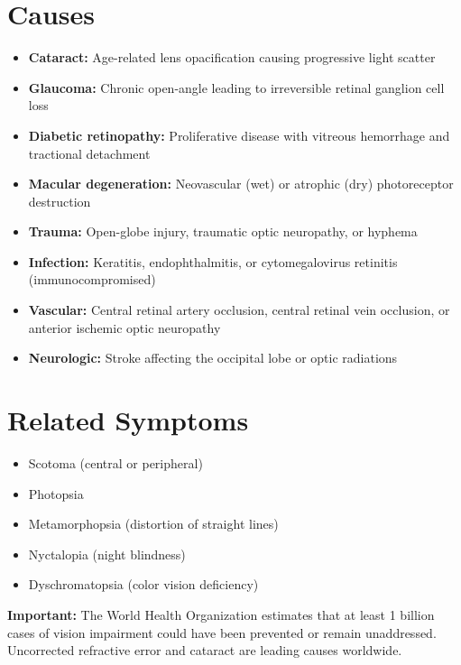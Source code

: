 \section*{Causes}
\begin{itemize}
 \item \textbf{Cataract:} Age-related lens opacification causing progressive light scatter
 \item \textbf{Glaucoma:} Chronic open-angle leading to irreversible retinal ganglion cell loss
 \item \textbf{Diabetic retinopathy:} Proliferative disease with vitreous hemorrhage and tractional detachment
 \item \textbf{Macular degeneration:} Neovascular (wet) or atrophic (dry) photoreceptor destruction
 \item \textbf{Trauma:} Open-globe injury, traumatic optic neuropathy, or hyphema
 \item \textbf{Infection:} Keratitis, endophthalmitis, or cytomegalovirus retinitis (immunocompromised)
 \item \textbf{Vascular:} Central retinal artery occlusion, central retinal vein occlusion, or anterior ischemic optic neuropathy
 \item \textbf{Neurologic:} Stroke affecting the occipital lobe or optic radiations
\end{itemize}

\section*{Related Symptoms}
\begin{itemize}
 \item Scotoma (central or peripheral)
 \item Photopsia
 \item Metamorphopsia (distortion of straight lines)
 \item Nyctalopia (night blindness)
 \item Dyschromatopsia (color vision deficiency)
\end{itemize}
\textbf{Important:} The World Health Organization estimates that at least 1 billion cases of vision impairment could have been prevented or remain unaddressed. Uncorrected refractive error and cataract are leading causes worldwide.

